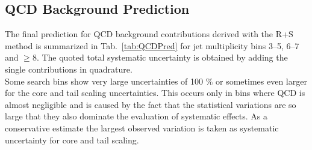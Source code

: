 \subsection{QCD Background Prediction}
\label{subsec:RA2_qcd_pred}
The final prediction for QCD background contributions derived with the R+S method is summarized in Tab.~\ref{tab:QCDPred} for jet multiplicity bins 3--5, 6--7 and $\ge 8$. The quoted total systematic uncertainty is obtained by adding the single contributions in quadrature. \\
Some search bins show very large uncertainties of 100 $\%$ or sometimes even larger for the core and tail scaling uncertainties. This occurs only in bins where QCD is almost negligible and is caused by the fact that the statistical variations are so large that they also dominate the evaluation of systematic effects. As a conservative estimate the largest observed variation is taken as systematic uncertainty for core and tail scaling. 
